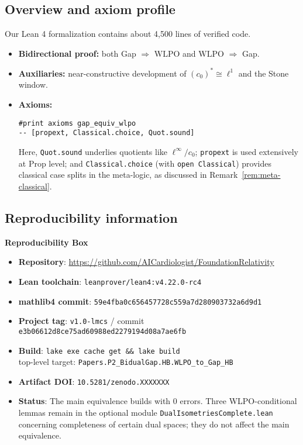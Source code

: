 \documentclass{lmcs}
\newcommand{\leanRepo}{\url{https://github.com/AICardiologist/FoundationRelativity}}
\newcommand{\linf}{\ell^\infty}
\newcommand{\cnull}{c_0}
\newcommand{\WLPO}{\mathrm{WLPO}}
\begin{document}
\subsection{Overview and axiom profile}\label{sec:axioms}

Our Lean 4 formalization contains about 4{,}500 lines of verified code.
\begin{itemize}
\item \textbf{Bidirectional proof:} both Gap $\Rightarrow$ $\WLPO$ and $\WLPO$ $\Rightarrow$ Gap.
\item \textbf{Auxiliaries:} near-constructive development of $(\cnull)^*\cong \ell^1$ and the Stone window.
\item \textbf{Axioms:}
\begin{lstlisting}[language=Lean,numbers=none]
#print axioms gap_equiv_wlpo
-- [propext, Classical.choice, Quot.sound]
\end{lstlisting}
Here, \texttt{Quot.sound} underlies quotients like $\linf/\cnull$; \texttt{propext} is used extensively at Prop level; and \texttt{Classical.choice} (with \texttt{open Classical}) provides classical case splits in the meta-logic, as discussed in Remark~\ref{rem:meta-classical}.
\end{itemize}

\subsection{Reproducibility information}

\begin{mdframed}[backgroundcolor=gray!10]
\textbf{Reproducibility Box}
\begin{itemize}
\item \textbf{Repository}: \leanRepo
\item \textbf{Lean toolchain}: \texttt{leanprover/lean4:v4.22.0-rc4}
\item \textbf{mathlib4 commit}: \texttt{59e4fba0c656457728c559a7d280903732a6d9d1}
\item \textbf{Project tag}: \texttt{v1.0-lmcs} / commit \texttt{e3b06612d8ce75ad60988ed2279194d08a7ae6fb}
\item \textbf{Build}: \texttt{lake exe cache get \&\& lake build} \\
      top-level target: \texttt{Papers.P2\_BidualGap.HB.WLPO\_to\_Gap\_HB}
\item \textbf{Artifact DOI}: \texttt{10.5281/zenodo.XXXXXXX} %
\item \textbf{Status}: The main equivalence builds with 0 errors. Three WLPO-conditional lemmas remain in the optional module \texttt{DualIsometriesComplete.lean} concerning completeness of certain dual spaces; they do not affect the main equivalence.
\end{itemize}
\end{mdframed}
\end{document}
